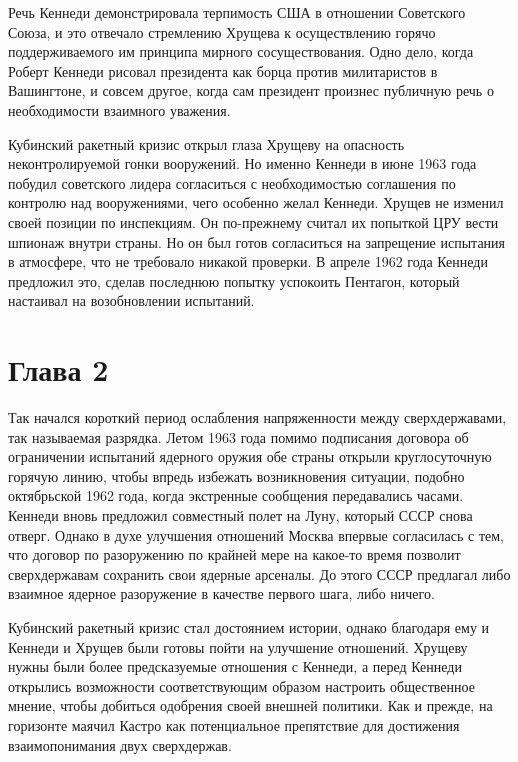 \documentclass[14pt]{extreport}
\begin{document}
Речь Кеннеди демонстрировала терпимость США в отношении Советского Союза, и это отвечало стремлению Хрущева к осуществлению горячо поддерживаемого им принципа мирного сосуществования. Одно дело, когда Роберт Кеннеди рисовал президента как борца против милитаристов в Вашингтоне, и совсем другое, когда сам президент произнес публичную речь о необходимости взаимного уважения.

Кубинский ракетный кризис открыл глаза Хрущеву на опасность неконтролируемой гонки вооружений. Но именно Кеннеди в июне 1963 года побудил советского лидера согласиться с необходимостью соглашения по контролю над вооружениями, чего особенно желал Кеннеди. Хрущев не изменил своей позиции по инспекциям. Он по-прежнему считал их попыткой ЦРУ вести шпионаж внутри страны. Но он был готов согласиться на запрещение испытания в атмосфере, что не требовало никакой проверки. В апреле 1962 года Кеннеди предложил это, сделав последнюю попытку успокоить Пентагон, который настаивал на возобновлении испытаний.

\section{Глава 2}

Так начался короткий период ослабления напряженности между сверхдержавами, так называемая разрядка. Летом 1963 года помимо подписания договора об ограничении испытаний ядерного оружия обе страны открыли круглосуточную горячую линию, чтобы впредь избежать возникновения ситуации, подобно октябрьской 1962 года, когда экстренные сообщения передавались часами. Кеннеди вновь предложил совместный полет на Луну, который СССР снова отверг. Однако в духе улучшения отношений Москва впервые согласилась с тем, что договор по разоружению по крайней мере на какое-то время позволит сверхдержавам сохранить свои ядерные арсеналы. До этого СССР предлагал либо взаимное ядерное разоружение в качестве первого шага, либо ничего.

Кубинский ракетный кризис стал достоянием истории, однако благодаря ему и Кеннеди и Хрущев были готовы пойти на улучшение отношений. Хрущеву нужны были более предсказуемые отношения с Кеннеди, а перед Кеннеди открылись возможности соответствующим образом настроить общественное мнение, чтобы добиться одобрения своей внешней политики. Как и прежде, на горизонте маячил Кастро как потенциальное препятствие для достижения взаимопонимания двух сверхдержав.
\end{document}
